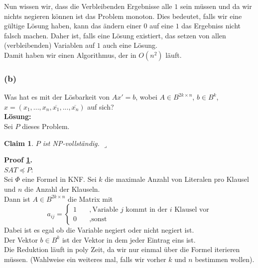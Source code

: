 \documentclass[11pt,a4paper,ngerman]{article}
\newtheorem{lemma}{\bfseries Claim}
\begin{document}
Nun wissen wir, dass die Verbleibenden Ergebnisse alle $1$ sein müssen und da wir nichts negieren können ist das Problem monoton. Dies bedeutet,
falls wir eine gültige Lösung haben, kann das ändern einer $0$ auf eine $1$ das Ergebniss nicht falsch machen. Daher ist, falls eine Lösung existiert,
das setzen von allen (verbleibenden) Variablen auf $1$ auch eine Lösung.\\

Damit haben wir einen Algorithmus, der in $O(n^2)$ läuft.

\subsubsection*{(b)}

Was hat es mit der Lösbarkeit von $Ax' = b$, wobei $A \in B^{2k \times n}$, $b \in B^k$, $x = (x_1, ..., x_n, \overline{x_1}, ..., \overline{x_n})$ auf sich?\\

\textbf{Lösung:}\\

Sei $P$ dieses Problem.\\

\begin{lemma}\label{ha2:ueb2:matsat} $P$ ist NP-vollständig. \mbox{}\hfill$\lrcorner$
\end{lemma}

\textbf{Proof \ref{ha2:ueb2:matsat}.}\\
$SAT \preceq P$:\\
    Sei $\Phi$ eine Formel in KNF.
    Sei $k$ die maximale Anzahl von Literalen pro Klausel und $n$ die Anzahl der Klauseln.\\
    Dann ist $A \in B^{2k \times n}$ die Matrix mit
    \begin{equation*}
        a_{ij}  = \left\{ 
            \begin{array}{lr} 
                1\quad&,\text{Variable $j$ kommt in der $i$ Klausel vor}\\
                0&,\text{sonst}
            \end{array}\right.
    \end{equation*}
    Dabei ist es egal ob die Variable negiert oder nicht negiert ist.\\
    Der Vektor $b \in B^k$ ist der Vektor in dem jeder Eintrag eins ist.\\

Die Reduktion läuft in poly Zeit, da wir nur einmal über die Formel iterieren müssen. (Wahlweise
ein weiteres mal, falls wir vorher $k$ und $n$ bestimmen wollen).\\
\end{document}
